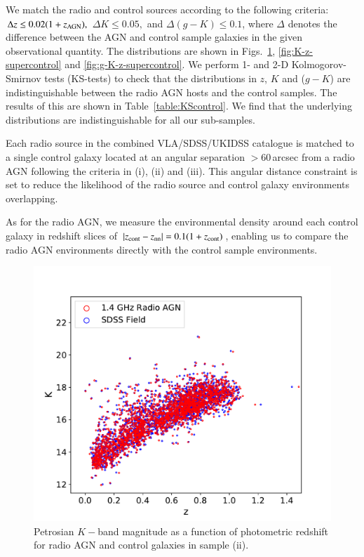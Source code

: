 We match the radio and control sources according to the following criteria: $\Delta z \leq 0.02(1+z_{\rm{AGN}}),$ $\Delta K \leq 0.05,$ and $\Delta(g-K) \leq 0.1$, where $\Delta$ denotes the difference between the AGN and control sample galaxies in the given observational quantity. The distributions are shown in Figs.~\ref{fig:K-z-control}, \ref{fig:K-z-supercontrol} and \ref{fig:g-K-z-supercontrol}. We perform 1- and 2-D Kolmogorov-Smirnov tests (KS-tests) to check that the distributions in $z$, $K$ and ($g-K$) are indistinguishable between the radio AGN hosts and the control samples. The results of this are shown in Table~\ref{table:KScontrol}. We find that the underlying distributions are indistinguishable for all our sub-samples.

Each radio source in the combined VLA/SDSS/UKIDSS catalogue is matched to a single control galaxy located at an angular separation $>60$\,arcsec from a radio AGN following the criteria in (i), (ii) and (iii). This angular distance constraint is set to reduce the likelihood of the radio source and control galaxy environments overlapping. 

As for the radio AGN, we measure the environmental density around each control galaxy in redshift slices of $| z_{\rm{cont}} - z_{\rm{nn}}| = 0.1(1+z_{\rm{cont}})$, enabling us to compare the radio AGN environments directly with the control sample environments.

\begin{figure}
 \begin{center}
   \includegraphics[width=0.8\columnwidth]{plots_chp2/K_z_control.pdf}
   \caption[$K-$band-redshift diagram for radio AGN and sample (ii) control galaxies]{Petrosian $K-$band magnitude as a function of photometric redshift for radio AGN and control galaxies in sample (ii).}
   \label{fig:K-z-control}
 \end{center}
\end{figure}

